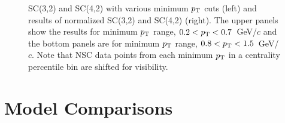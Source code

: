 \documentclass[ALICE,manyauthors]{cernphprep}
\begin{document}
\begin{figure}[p]
\begin{center}
        \caption{SC(3,2) and SC(4,2) with various minimum $p_{\rm T}$ cuts (left) and results of normalized SC(3,2) and SC(4,2) (right). The upper panels show the results for minimum $p_{\rm T}$ range, $0.2<p_{\rm T}<0.7$~GeV/$c$ and the bottom panels are for minimum $p_{\rm T}$ range, $0.8<p_{\rm T}<1.5$~GeV/$c$. Note that NSC data points from each minimum $p_{\rm T}$ in a centrality percentile bin are shifted for visibility.}
        \label{fig:Figure_2}
        \end{center}   
\end{figure}
 
\pagebreak

\section{Model Comparisons}
\label{sec:theory}
\end{document}
